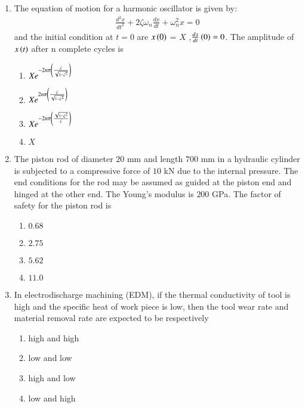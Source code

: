 \documentclass[journal]{IEEEtran}
\begin{document}
\begin{enumerate}[start = 52]
    \item The equation of motion for a harmonic oscillator is given by:
    \begin{align*}
    {\frac{d^2 x}{dt^2}} + 2\zeta \omega_n \frac{dx}{dt} + \omega_n^2 x = 0
    \end{align*}
    and the initial condition at $t = 0$ are $x\left(0\right)$ = $X$ ,$ \frac{dx}{dt}\left(0\right) = 0$. The amplitude of $x\left(t\right)$ after n complete cycles is
    \begin{multicols}{2}
    \begin{enumerate}
        \item $X e^{-2n\pi \left(\frac{\zeta}{\sqrt{1 - \zeta^2}}\right)}$
        \item $X e^{2n\pi \left(\frac{\zeta}{\sqrt{1 - \zeta^2}}\right)}$
        \item $X e^{-2n\pi \left(\frac{\sqrt{1 - \zeta^2}}{\zeta}\right)}$
        \item $X$
    \end{enumerate}
    \end{multicols}

    \item The piston rod of diameter $20$ mm and length $ 700$ mm in a hydraulic cylinder is subjected to a compressive force of $10$ kN due to the internal pressure. The end conditions for the rod may be assumed as guided at the piston end and hinged at the other end. The Young's modulus is $200$ GPa. The factor of safety for the piston rod is
     \begin{multicols}{4}
        \begin{enumerate}
            \item $0.68$
            \item $2.75$
            \item $5.62$
            \item $11.0$
        \end{enumerate}
    \end{multicols}

    \item In electrodischarge machining (EDM), if the thermal conductivity of tool is high and the specific heat of work piece is low, then the tool wear rate and material removal rate are expected to be respectively
     \begin{multicols}{2}
    \begin{enumerate}
        \item high and high
        \item low and low
        \item high and low
        \item low and high
    \end{enumerate}
    \end{multicols}


\end{enumerate}
\end{document}
